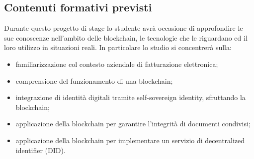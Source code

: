 \subsection{Contenuti formativi previsti}
	Durante questo progetto di stage lo studente avrà occasione di approfondire le sue conoscenze nell'ambito delle blockchain, le tecnologie che le riguardano ed il loro utilizzo in situazioni reali.
	\newline
	In particolare lo studio si concentrerà sulla:
	\begin{itemize}
		\item familiarizzazione col contesto aziendale di fatturazione elettronica;
		\item comprensione del funzionamento di una blockchain;
		\item integrazione di identità digitali tramite self-sovereign identity, sfruttando la blockchain;
		\item applicazione della blockchain per garantire l'integrità di documenti condivisi;
		\item applicazione della blockchain per implementare un servizio di decentralized identifier (DID).
	\end{itemize}
